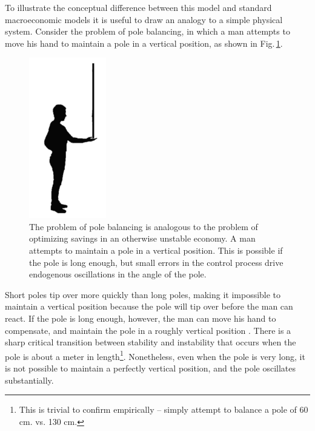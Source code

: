 To illustrate the conceptual difference between this model and standard macroeconomic models it is useful to draw an analogy to a simple physical system.  Consider the problem of pole balancing, in which a man attempts to move his hand to maintain a pole in a vertical position, as shown in Fig.\,\ref{pole_balancing}. 
\begin{figure}
  \begin{minipage}[c]{0.5\textwidth}

	\caption[]{{ The problem of pole balancing is analogous to the problem of optimizing savings in an otherwise unstable economy.}  A man attempts to maintain a pole in a vertical position.  This is possible if the pole is long enough, but small errors in the control process drive endogenous oscillations in the angle of the pole.}
   \label{pole_balancing}
  \end{minipage}
  \begin{minipage}[c]{0.5\textwidth}
    \hspace{2 cm}\includegraphics[width=0.3\textwidth]
       {figures/fig5.jpeg}
  \end{minipage}\hfill

\end{figure}
Short poles tip over more quickly than long poles, making it impossible to maintain a vertical position because the pole will tip over before the man can react.  If the pole is long enough, however, the man can move his hand to compensate, and maintain the pole in a roughly vertical position \cite{insperger2017stick}.  There is a sharp critical transition between stability and instability that occurs when the pole is about a meter in length\footnote{This is trivial to confirm empirically -- simply attempt to balance a pole of 60 cm. vs. 130 cm.}.
Nonetheless, even when the pole is very long, it is not possible to maintain a perfectly vertical position, and the 
pole oscillates substantially.

